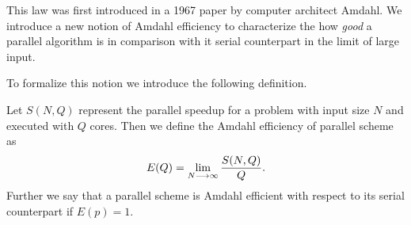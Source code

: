 This law was first introduced in a 1967 paper by computer architect Amdahl. We introduce a new notion of Amdahl efficiency to characterize the how \emph{good} a parallel algorithm is in comparison with it serial counterpart in the limit of large input. 

To formalize this notion we introduce the following definition.
\begin{mdframed}[innertopmargin=10pt]
\begin{definition}
\label{def:amdahl_efficient}
    Let $ S(N,Q) $ represent the parallel speedup for a problem with input size $ N $ and executed with $ Q $ cores.
    Then we define the Amdahl efficiency of parallel scheme as 
    \begin{align}
        E(Q) = \lim_{N \longrightarrow \infty} \frac{S(N, Q)}{Q}.
    \end{align}
    Further we say that a parallel scheme is Amdahl efficient with respect to its serial counterpart if $ E(p) = 1 $.
\end{definition}
\end{mdframed}

